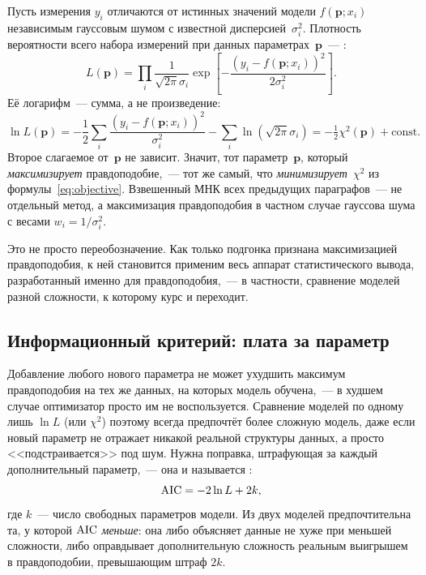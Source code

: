 \begin{strict}
Пусть измерения $y_i$ отличаются от истинных значений модели $f(\mathbf{p};x_i)$ независимым
гауссовым шумом с известной дисперсией~$\sigma_i^2$. Плотность вероятности всего набора
измерений при данных параметрах~$\mathbf{p}$~--- :
\[
  L(\mathbf{p})=\prod_i\frac{1}{\sqrt{2\pi}\sigma_i}
  \exp\!\left[-\frac{(y_i-f(\mathbf{p};x_i))^2}{2\sigma_i^2}\right] .
\]
Её логарифм~--- сумма, а не произведение:
\[
  \ln L(\mathbf{p})=-\frac12\sum_i\frac{(y_i-f(\mathbf{p};x_i))^2}{\sigma_i^2}
  -\sum_i\ln(\sqrt{2\pi}\sigma_i)
  =-\tfrac12\chi^2(\mathbf{p})+\text{const} .
\]
Второе слагаемое от~$\mathbf{p}$ не зависит. Значит, тот параметр~$\mathbf{p}$, который
\emph{максимизирует} правдоподобие,~--- тот же самый, что \emph{минимизирует}~$\chi^2$ из
формулы~\eqref{eq:objective}. Взвешенный МНК всех предыдущих параграфов~--- не отдельный метод,
а максимизация правдоподобия в частном случае гауссова шума с весами $w_i=1/\sigma_i^2$.
\end{strict}

\begin{intuition}
Это не просто переобозначение. Как только подгонка признана максимизацией правдоподобия, к ней
становится применим весь аппарат статистического вывода, разработанный именно для правдоподобия,~---
в частности, сравнение моделей разной сложности, к которому курс и переходит.
\end{intuition}

\subsection{Информационный критерий: плата за параметр}
\label{subsec:aic}

\begin{intuition}
Добавление любого нового параметра не может ухудшить максимум правдоподобия на тех же данных, на
которых модель обучена,~--- в худшем случае оптимизатор просто им не воспользуется. Сравнение
моделей по одному лишь $\ln L$ (или $\chi^2$) поэтому всегда предпочтёт более сложную модель, даже
если новый параметр не отражает никакой реальной структуры данных, а просто <<подстраивается>> под
шум. Нужна поправка, штрафующая за каждый дополнительный параметр,~--- она и называется
:
\begin{equation}
  \operatorname{AIC}=-2\ln L+2k,
  \label{eq:aic}
\end{equation}
где $k$~--- число свободных параметров модели. Из двух моделей предпочтительна та, у которой
$\operatorname{AIC}$ \emph{меньше}: она либо объясняет данные не хуже при меньшей сложности, либо оправдывает
дополнительную сложность реальным выигрышем в правдоподобии, превышающим штраф $2k$.
\end{intuition}

